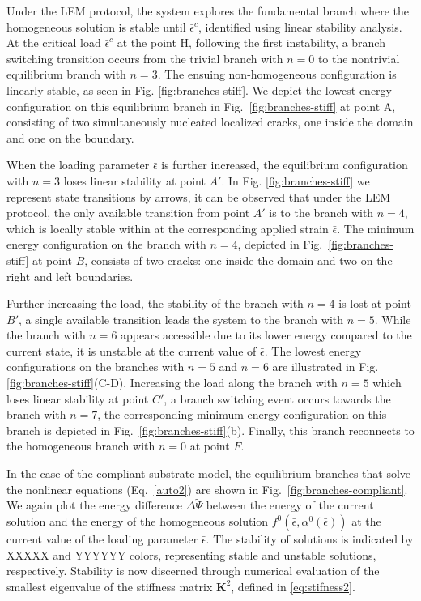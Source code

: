 Under the LEM protocol, the system explores the fundamental branch where the homogeneous solution is stable until $\bar\epsilon^c$, identified using linear stability analysis. At the critical load $\bar\epsilon^c$  at the point H, following the first instability, a branch switching transition occurs from the trivial branch with $n = 0$ to the nontrivial equilibrium branch with $n = 3$. The ensuing non-homogeneous configuration is linearly stable, as seen in Fig. \ref{fig:branches-stiff}. We depict the lowest energy configuration on this equilibrium branch in Fig.~\ref{fig:branches-stiff} at point A, consisting of two simultaneously nucleated localized cracks, one inside the domain and one on the boundary. 

When the loading parameter $\bar{\epsilon}$ is further increased, the equilibrium configuration with $n=3$ loses linear stability at point $A'$. In Fig. \ref{fig:branches-stiff} we represent state transitions by arrows, it can be observed that under the LEM protocol, the only available transition from point $A'$ is to the branch with $n=4$, which is locally stable within at the corresponding applied strain $\bar{\epsilon}$. The minimum energy configuration on the branch with $n=4$, depicted in Fig.~\ref{fig:branches-stiff} at point $B$, consists of two cracks: one inside the domain and two on the right and left boundaries.

Further increasing the load, the stability of the branch with $n=4$ is lost at point $B'$, a single available transition leads the system to the branch with $n=5$. While the branch with $n=6$ appears accessible due to its lower energy compared to the current state, it is unstable at the current value of $\bar\epsilon$. The lowest energy configurations on the branches with $n=5$ and $n=6$ are illustrated in Fig. \ref{fig:branches-stiff}(C-D). Increasing the load along the branch with $n=5$ which loses linear stability at point $C'$, a branch switching event occurs towards the branch with $n=7$, the corresponding minimum energy configuration on this branch is depicted in Fig.~\ref{fig:branches-stiff}(b). Finally, this branch reconnects to the homogeneous branch with $n=0$ at point $F$.

In the case of the compliant substrate model, the equilibrium branches that solve the nonlinear equations (Eq.~\ref{auto2}) are shown in Fig.~\ref{fig:branches-compliant}. We again plot the energy difference $\Delta \widetilde\Psi$ between the energy of the current solution and the energy of the homogeneous solution $f^0(\bar{\epsilon}, \alpha^0(\bar{\epsilon}))$ at the current value of the loading parameter $\bar\epsilon$. The stability of solutions is indicated by XXXXX and YYYYYY colors, representing stable and unstable solutions, respectively. Stability is now discerned through numerical evaluation of the smallest eigenvalue of the stiffness matrix $\mathbf{K}^2$, defined in \eqref{eq:stifness2}.

